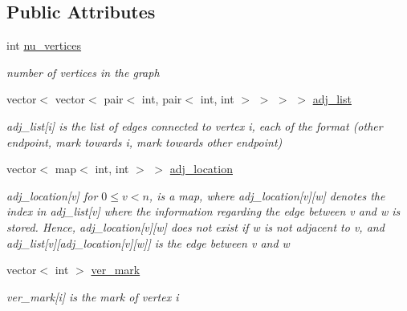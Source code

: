 \subsection*{Public Attributes}
\begin{DoxyCompactItemize}
\item 
int \hyperlink{classmarked__graph_acf79c6aeb8f32614cb14a5baaa6c9f9b}{nu\+\_\+vertices}
\begin{DoxyCompactList}\small\item\em number of vertices in the graph \end{DoxyCompactList}\item 
vector$<$ vector$<$ pair$<$ int, pair$<$ int, int $>$ $>$ $>$ $>$ \hyperlink{classmarked__graph_a1a0bf7ca413a278763f7c878b3b6fd6f}{adj\+\_\+list}
\begin{DoxyCompactList}\small\item\em adj\+\_\+list\mbox{[}i\mbox{]} is the list of edges connected to vertex i, each of the format (other endpoint, mark towards i, mark towards other endpoint) \end{DoxyCompactList}\item 
vector$<$ map$<$ int, int $>$ $>$ \hyperlink{classmarked__graph_a3ae722ea9583ad23af34d789a88ac01a}{adj\+\_\+location}
\begin{DoxyCompactList}\small\item\em adj\+\_\+location\mbox{[}v\mbox{]} for $0 \leq v < n$, is a map, where adj\+\_\+location\mbox{[}v\mbox{]}\mbox{[}w\mbox{]} denotes the index in adj\+\_\+list\mbox{[}v\mbox{]} where the information regarding the edge between v and w is stored. Hence, adj\+\_\+location\mbox{[}v\mbox{]}\mbox{[}w\mbox{]} does not exist if w is not adjacent to v, and adj\+\_\+list\mbox{[}v\mbox{]}\mbox{[}adj\+\_\+location\mbox{[}v\mbox{]}\mbox{[}w\mbox{]}\mbox{]} is the edge between v and w \end{DoxyCompactList}\item 
vector$<$ int $>$ \hyperlink{classmarked__graph_ac83e9377dd4d8bb95be1ac949b127296}{ver\+\_\+mark}
\begin{DoxyCompactList}\small\item\em ver\+\_\+mark\mbox{[}i\mbox{]} is the mark of vertex i \end{DoxyCompactList}\end{DoxyCompactItemize}
